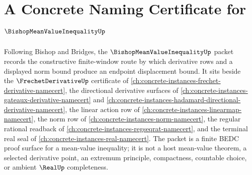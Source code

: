 \chapter{A Concrete Naming Certificate for $\BishopMeanValueInequalityUp$}
\label{ch:concrete-instances-bishop-mean-value-inequality-namecert}

Following Bishop and Bridges, the $\BishopMeanValueInequalityUp$ packet records the constructive finite-window route by which derivative rows and a displayed norm bound produce an endpoint displacement bound. It sits beside the $\FrechetDerivativeUp$ certificate of \autoref{ch:concrete-instances-frechet-derivative-namecert}, the directional derivative surfaces of \autoref{ch:concrete-instances-gateaux-derivative-namecert} and \autoref{ch:concrete-instances-hadamard-directional-derivative-namecert}, the linear action row of \autoref{ch:concrete-instances-linearmap-namecert}, the norm row of \autoref{ch:concrete-instances-norm-namecert}, the regular rational readback of \autoref{ch:concrete-instances-regseqrat-namecert}, and the terminal real seal of \autoref{ch:concrete-instances-real-namecert}. The packet is a finite BEDC proof surface for a mean-value inequality; it is not a host mean-value theorem, a selected derivative point, an extremum principle, compactness, countable choice, or ambient $\RealUp$ completeness.

